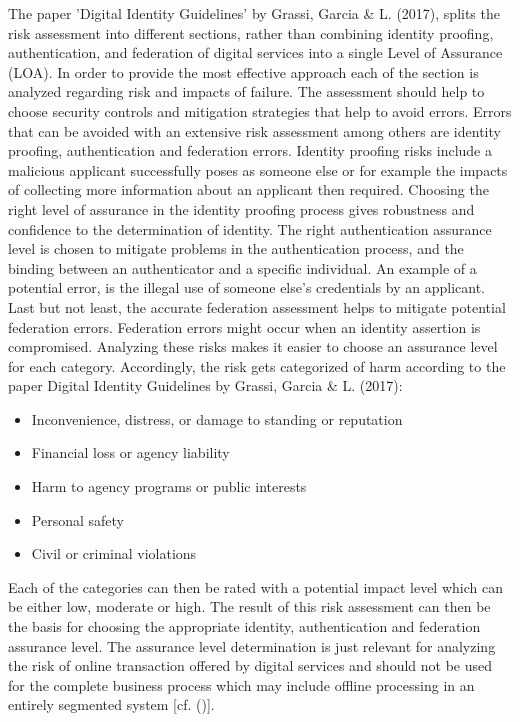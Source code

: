 The paper 'Digital Identity Guidelines' by Grassi, Garcia \& L. (2017), splits the risk assessment into different sections, rather than combining identity proofing, authentication, and federation of digital services into a single Level of Assurance (LOA). In order to provide the most effective approach each of the section is analyzed regarding risk and impacts of failure. The assessment should help to choose security controls and mitigation strategies that help to avoid errors. Errors that can be avoided with an extensive risk assessment among others are identity proofing, authentication and federation errors. Identity proofing risks include a malicious applicant successfully poses as someone else or for example the impacts of collecting more information about an applicant then required. Choosing the right level of assurance in the identity proofing process gives robustness and confidence to the determination of identity. The right authentication assurance level is chosen to mitigate problems in the authentication process, and the binding between an authenticator and a specific individual. An example of a potential error, is the illegal use of someone else's credentials by an applicant. Last but not least, the accurate federation assessment helps to mitigate potential federation errors. Federation errors might occur when an identity assertion is compromised. Analyzing these risks makes it easier to choose an assurance level for each category. Accordingly, the risk gets categorized of harm according to the paper Digital Identity Guidelines by Grassi, Garcia \& L. (2017): 

\begin{itemize}
	\item Inconvenience, distress, or damage to standing or reputation
	\item Financial loss or agency liability
	\item Harm to agency programs or public interests
	\item Personal safety
	\item Civil or criminal violations
\end{itemize}

Each of the categories can then be rated with a potential impact level which can be either low, moderate or high. The result of this risk assessment can then be the basis for choosing the appropriate identity, authentication and federation assurance level. The assurance level determination is just relevant for analyzing the risk of online transaction offered by digital services and should not be used for the complete business process which may include offline processing in an entirely segmented system [cf. (\cite{NIST:2017:DIG})]. 

